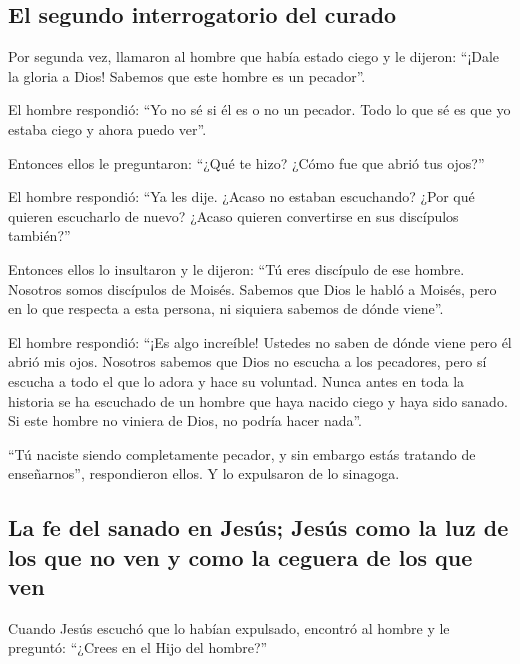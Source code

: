 \hypertarget{el-segundo-interrogatorio-del-curado}{%
\subsection{El segundo interrogatorio del
curado}\label{el-segundo-interrogatorio-del-curado}}

 Por segunda vez, llamaron al hombre que había estado
ciego y le dijeron: ``¡Dale la gloria a Dios! Sabemos que este hombre es
un pecador''.

 El hombre respondió: ``Yo no sé si él es o no un
pecador. Todo lo que sé es que yo estaba ciego y ahora puedo ver''.

 Entonces ellos le preguntaron: ``¿Qué te hizo? ¿Cómo fue
que abrió tus ojos?''

 El hombre respondió: ``Ya les dije. ¿Acaso no estaban
escuchando? ¿Por qué quieren escucharlo de nuevo? ¿Acaso quieren
convertirse en sus discípulos también?''

 Entonces ellos lo insultaron y le dijeron: ``Tú eres
discípulo de ese hombre.  Nosotros somos discípulos de
Moisés. Sabemos que Dios le habló a Moisés, pero en lo que respecta a
esta persona, ni siquiera sabemos de dónde viene''.

 El hombre respondió: ``¡Es algo increíble! Ustedes no
saben de dónde viene pero él abrió mis ojos.  Nosotros
sabemos que Dios no escucha a los pecadores, pero sí escucha a todo el
que lo adora y hace su voluntad.  Nunca antes en toda la
historia se ha escuchado de un hombre que haya nacido ciego y haya sido
sanado.  Si este hombre no viniera de Dios, no podría
hacer nada''.

 ``Tú naciste siendo completamente pecador, y sin embargo
estás tratando de enseñarnos'', respondieron ellos. Y lo expulsaron de
lo sinagoga.

\hypertarget{la-fe-del-sanado-en-jesuxfas-jesuxfas-como-la-luz-de-los-que-no-ven-y-como-la-ceguera-de-los-que-ven}{%
\subsection{La fe del sanado en Jesús; Jesús como la luz de los que no
ven y como la ceguera de los que
ven}\label{la-fe-del-sanado-en-jesuxfas-jesuxfas-como-la-luz-de-los-que-no-ven-y-como-la-ceguera-de-los-que-ven}}

 Cuando Jesús escuchó que lo habían expulsado, encontró
al hombre y le preguntó: ``¿Crees en el Hijo del hombre?''

